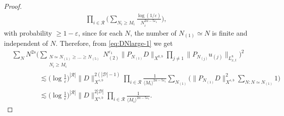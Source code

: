 \documentclass[11pt, xcolor = dvipsnames,reqno
]{amsart}
\theoremstyle{definition}
\theoremstyle{remark}
\begin{document}
\begin{proof}
\begin{align}
    \prod_{i \in \mathcal R} \Big(\sum_{N_i \geq M_i } \frac{\log (1/\varepsilon)}{N_i^{2\alpha - 5\varepsilon_1}} \Big),
\end{align}
with probability $\geq 1 - \varepsilon$, since for each $N$, the number of $N_{(1)} \simeq N$ is finite and independent of $N$. 
Therefore, from \eqref{eq:DNlarge-1} we get
\begin{align}
    & \sum_N N^{2s} \Big( \sum_{\substack{N \simeq N_{(1)} \geq \ldots \geq N_{(5)} \\ N_i \geq M_i }} N_{(2)}^{\varepsilon_1} \|P_{N_{(1)}} D \|_{X^{0,b}} \prod_{j \neq 1} \|P_{N_{(j)}} u_{(j)}\|_{L^8_{x,t}} \Big)^2 \\
    & \qquad \qquad \lesssim \Big(  \log \frac{1}{\varepsilon} \Big)^{|\mathcal{R}|} \|D\|_{X^{s,b}}^{2(|\mathcal{D}| - 1)} \prod_{i \in \mathcal{R}} \frac{1}{ \langle M_i \rangle^{2\alpha - 5\varepsilon_1}}  \sum_{N_{(1)}} \Big( \|P_{N_{(1)}} D\|_{X^{s,b}}^2  \sum_{N:N \simeq N_{(1)}} 1 \Big) \\
    & \qquad \qquad \lesssim \Big(  \log \frac{1}{\varepsilon} \Big)^{|\mathcal{R}|} \|D\|_{X^{s,b}}^{2|\mathcal{D}|} \prod_{i \in \mathcal{R}} \frac{1}{\langle M_i \rangle^{2\alpha - 5\varepsilon_1}}.
\end{align}


\end{proof}
\end{document}
